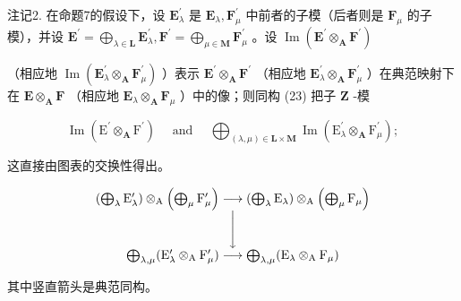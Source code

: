 注记2. 在命题7的假设下，设 \(\mathbf{E}_{\lambda}^{\prime}\) 是 \(\mathbf{E}_{\lambda}, \mathbf{F}_{\mu}^{\prime}\) 中前者的子模（后者则是 \(\mathbf{F}_{\mu}\) 的子模），并设 \(\mathbf{E}^{\prime} = \bigoplus_{\lambda \in \mathbf{L}} \mathbf{E}_{\lambda}^{\prime}, \mathbf{F}^{\prime} = \bigoplus_{\mu \in \mathbf{M}} \mathbf{F}_{\mu}^{\prime}\) 。设 \(\operatorname{Im}(\mathbf{E}^{\prime} \otimes_{\mathbf{A}} \mathbf{F}^{\prime})\)

（相应地 \(\operatorname{Im}(\mathbf{E}_{\lambda}^{\prime}\otimes_{\mathbf{A}}\mathbf{F}_{\mu}^{\prime})\) ）表示 \(\mathbf{E}^{\prime}\otimes_{\mathbf{A}}\mathbf{F}^{\prime}\) （相应地 \(\mathbf{E}_{\lambda}^{\prime}\otimes_{\mathbf{A}}\mathbf{F}_{\mu}^{\prime}\) ）在典范映射下在 \(\mathbf{E}\otimes_{\mathbf{A}}\mathbf{F}\) （相应地 \(\mathbf{E}_{\lambda}\otimes_{\mathbf{A}}\mathbf{F}_{\mu}\) ）中的像；则同构 (23) 把子 \(\mathbf{Z}\) -模

\[
\operatorname{Im} \left(\mathrm{E} ^ {\prime} \otimes_ {\mathbf {A}} \mathrm{F} ^ {\prime}\right) \quad \text { and } \quad \bigoplus_ {(\lambda , \mu) \in \mathbf {L} \times \mathbf {M}} \operatorname{Im} \left(\mathrm{E} _ {\lambda} ^ {\prime} \otimes_ {\mathbf {A}} \mathrm{F} _ {\mu} ^ {\prime}\right);
\]

这直接由图表的交换性得出。

\[
\begin{array}{c} \left(\bigoplus_ {\lambda} \mathrm{E} _ {\lambda} ^ {\prime}\right) \otimes_ {\mathrm{A}} \left(\bigoplus_ {\mu} \mathrm{F} _ {\mu} ^ {\prime}\right) \longrightarrow \left(\bigoplus_ {\lambda} \mathrm{E} _ {\lambda}\right) \otimes_ {\mathrm{A}} \left(\bigoplus_ {\mu} \mathrm{F} _ {\mu}\right) \\ \Biggl \downarrow \\ \bigoplus_ {\lambda , \mu} (\mathrm{E} _ {\lambda} ^ {\prime} \otimes_ {\mathrm{A}} \mathrm{F} _ {\mu} ^ {\prime}) \longrightarrow \bigoplus_ {\lambda , \mu} (\mathrm{E} _ {\lambda} \otimes_ {\mathrm{A}} \mathrm{F} _ {\mu}) \end{array}
\]

其中竖直箭头是典范同构。

